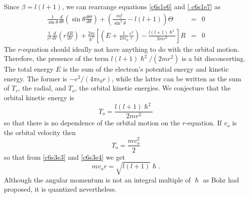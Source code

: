 Since $\beta = l(l+1)$, we can rearrange equations \eqref{c6s1e6} and \eqref{
c6s1e7} as 
\begin{eqnarray}
\frac{1}{\sin\theta}\frac{d}{d\theta}
\left(\sin\theta\frac{d\Theta}{d\theta}\right) + 
\left(\frac{m_l^2}{\sin^2\theta} - l(l+1)\right)\Theta &=& 0 \label{c6s3e1} \\
\frac{1}{r^2}\frac{d}{dr}\left(r\frac{dR}{dr}\right) + \frac{2m}{\hslash^2}
\left[\left(E + \frac{1}{4\pi\epsilon_0}\frac{e^2}{r}\right)
- \frac{l(l+1)\hslash^2}{2mr^2}\right]R &=& 0 \label{c6s3e2}
\end{eqnarray}
The $r$-equation should ideally not have anything to do with the orbital motion.
Therefore, the presence of the term $l(l+1)\hslash^2/(2mr^2)$ is a bit 
disconcerting. The total energy $E$ is the sum of the electron's potential
energy and kinetic energy. The former is $-e^2/(4\pi\epsilon_0 r)$, while the 
latter can be written as the sum of $T_r$, the radial, and $T_o$, the orbital
kinetic energies. We conjecture that the orbital kinetic energy is
\begin{equation}\label{c6s3e3}
T_o = \frac{l(l+1)\hslash^2}{2mr^2}
\end{equation}
so that there is no dependence of the orbital motion on the $r$-equation. If
$v_o$ is the orbital velocity then 
\begin{equation}\label{c6s3e4}
T_o = \frac{mv_o^2}{2}
\end{equation}
so that from \eqref{c6s3e3} and \eqref{c6s3e4} we get
\begin{equation}\label{c6s3e5}
mv_or = \sqrt{l(l+1)}\hslash.
\end{equation}
Although the angular momentum is not an integral multiple of $\hslash$ as Bohr
had proposed, it is quantized nevertheless.

